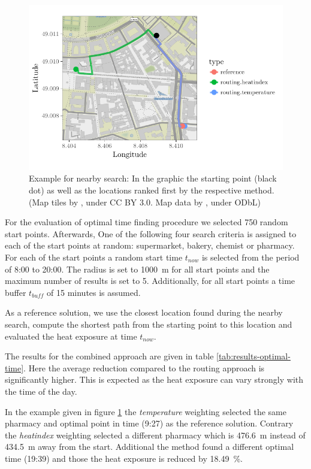 \begin{figure}
	\centering
	\includegraphics[scale=1]{figures/optimaltime_route_example}
	\caption{Example for nearby search: In the graphic the starting point (black dot) as well as the locations ranked first by the respective method. (Map tiles by \textcite{Stamen2017}, under CC BY 3.0. Map data by \textcite{OSMF2016}, under ODbL)}
	\label{fig:optimaltime-route-example}
\end{figure}

For the evaluation of optimal time finding procedure we selected 750 random start points. Afterwards, One of the following four search criteria is assigned to each of the start points at random: supermarket, bakery, chemist or pharmacy. For each of the start points a random start time $t_{now}$ is selected from the period of 8:00 to 20:00. The radius is set to \SI{1000}{\meter} for all start points and the maximum number of results is set to 5. Additionally, for all start points a time buffer $t_{buff}$ of 15 minutes is assumed. 

As a reference solution, we use the closest location found during the nearby search, compute the shortest path from the starting point to this location and evaluated the heat exposure at time $t_{now}$. 

The results for the combined approach are given in table \ref{tab:results-optimal-time}. Here the average reduction compared to the routing approach is significantly higher. This is expected as the heat exposure can vary strongly with the time of the day. 

In the example given in figure \ref{fig:optimaltime-route-example} the \emph{temperature} weighting selected the same pharmacy and optimal point in time (9:27) as the reference solution. Contrary the \emph{heatindex} weighting selected a different pharmacy which is \SI{476.6}{\meter} instead of  \SI{434.5}{\meter} away from the start. Additional the method found a different optimal time (19:39) and those the heat exposure is reduced by \SI{18.49}{\percent}.  
 
